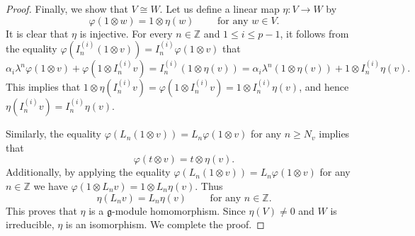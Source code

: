 \documentclass[10pt,a4paper]{amsart}
\def\al{\alpha}
\def\g{\mathfrak{g}}
\def\lmd{\lambda}
\def\vf{\varphi}
\newcommand{\Z}{\mathbb{Z}}
\newcommand{\elei}[2]{I_{#1}^{(#2)}}
\begin{document}
\begin{proof}
Finally, we show that $V\cong W$.
Let us define a linear map $\eta:V\longrightarrow W$ by
 $$\vf(1\otimes w)=1\otimes \eta(w)\qquad\text{ for any }w\in V.$$
 It is clear that $\eta$ is injective.
 For every $n\in\Z$ and $1\leq i\leq p-1$,
it follows from the equality $\vf\left(\elei ni(1\otimes v)\right)=\elei ni\vf(1\otimes v)$ that
 $$\al_i\lmd^n\vf(1\otimes v)+\vf\left(1\otimes \elei ni v\right)=\elei ni(1\otimes\eta(v))
   =\al_i\lmd^n(1\otimes\eta(v))+1\otimes\elei ni\eta(v).$$
This implies that $1\otimes\eta\left(\elei ni v\right)=\vf\left(1\otimes \elei ni v\right)=1\otimes\elei ni\eta(v)$, and hence
 $\eta\left(\elei ni v\right)=\elei ni\eta(v)$.

 Similarly, the equality $\vf(L_n(1\otimes v))=L_n\vf(1\otimes v)$ for any $n\geq N_v$ implies that
 $$\vf(t\otimes v)=t\otimes \eta(v).$$
Additionally, by applying the equality  $\vf(L_n(1\otimes v))=L_n\vf(1\otimes v)$ for any $n\in \Z$  we have
 $\vf(1\otimes L_nv)=1\otimes L_n\eta(v)$. Thus
 $$\eta(L_nv)=L_n\eta(v)\qquad\text{ for any }n\in\Z.$$
 This proves that $\eta$ is a $\g$-module homomorphism.
 Since $\eta(V)\neq 0$ and $W$ is irreducible, $\eta$ is an isomorphism.
 We complete the proof.
\end{proof}
\end{document}

